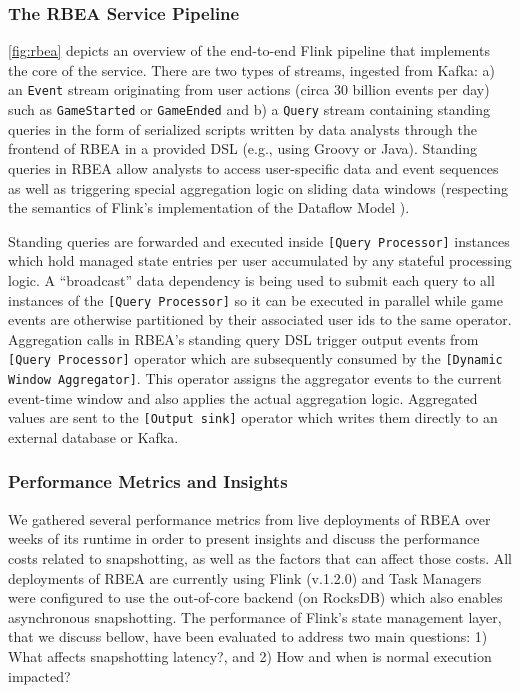 \subsubsection{The RBEA Service Pipeline}
\autoref{fig:rbea} depicts an overview of the end-to-end Flink pipeline that implements the core of the service. There are two types of streams, ingested from Kafka: a) an \texttt{Event} stream originating from  user actions (circa 30 billion events per day) such as \texttt{GameStarted} or \texttt{GameEnded} and b) a \texttt{Query} stream containing standing queries in the form of serialized scripts written by data analysts through the frontend of RBEA in a provided DSL (e.g., using Groovy or Java). Standing queries in RBEA allow analysts to access user-specific data and event sequences as well as triggering special aggregation logic on sliding data windows (respecting the semantics of Flink's implementation of the Dataflow Model \cite{akidau2015dataflow}). 

Standing queries are forwarded and executed inside \texttt{[Query Processor]} instances which hold managed state entries per user accumulated by any stateful processing logic. A ``broadcast'' data dependency is being used to submit each query to all instances of the \texttt{[Query Processor]} so it can be executed in parallel while game events are otherwise partitioned by their associated user ids to the same operator. Aggregation calls in RBEA's standing query DSL trigger output events from \texttt{[Query Processor]} operator which are subsequently consumed by the \texttt{[Dynamic Window Aggregator]}. This operator assigns the aggregator events to the current event-time window and also applies the actual aggregation logic. Aggregated values are sent to the \texttt{[Output sink]} operator which writes them directly to an external database or Kafka. 



\subsubsection{Performance Metrics and Insights} We gathered several performance metrics from live deployments of RBEA over weeks of its runtime in order to present insights and discuss the performance costs related to snapshotting, as well as the factors that can affect those costs. All deployments of RBEA are currently using Flink (v.1.2.0) and Task Managers were configured to use the out-of-core backend (on RocksDB) which also enables asynchronous snapshotting. The performance of Flink's state management layer, that we discuss bellow,  have been evaluated to address two main questions: 1) What affects  snapshotting latency?, and 2) How and when is normal execution impacted?

